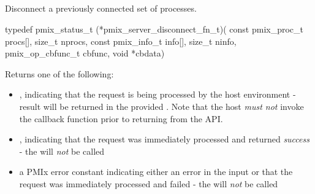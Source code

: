 \subsection{}

\summary

Disconnect a previously connected set of processes.

\format

\cspecificstart
\begin{codepar}
typedef pmix_status_t (*pmix_server_disconnect_fn_t)(
                             const pmix_proc_t procs[],
                             size_t nprocs,
                             const pmix_info_t info[],
                             size_t ninfo,
                             pmix_op_cbfunc_t cbfunc,
                             void *cbdata)
\end{codepar}
\cspecificend

\begin{arglist}
\end{arglist}

Returns one of the following:

\begin{itemize}
    \item {}, indicating that the request is being processed by the host environment - result will be returned in the provided . Note that the host \emph{must not} invoke the callback function prior to returning from the \ac{API}.
    \item {}, indicating that the request was immediately processed and returned \textit{success} - the  will \textit{not} be called
    \item a PMIx error constant indicating either an error in the input or that the request was immediately processed and failed - the  will \textit{not} be called
\end{itemize}

